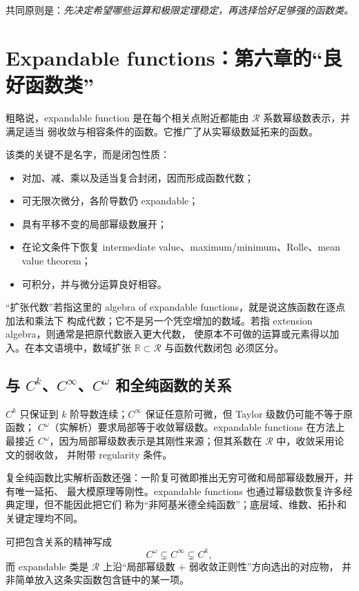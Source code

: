 \documentclass[11pt,a4paper]{article}
\theoremstyle{remark}
\newcommand{\LC}{\mathcal R}
\newcommand{\R}{\mathbb R}
\begin{document}
共同原则是：\emph{先决定希望哪些运算和极限定理稳定，再选择恰好足够强的函数类。}

\section{Expandable functions：第六章的“良好函数类”}

粗略说，expandable function 是在每个相关点附近都能由 $\LC$ 系数幂级数表示，并满足适当
弱收敛与相容条件的函数。它推广了从实幂级数延拓来的函数。

该类的关键不是名字，而是闭包性质：

\begin{itemize}
\item 对加、减、乘以及适当复合封闭，因而形成函数代数；
\item 可无限次微分，各阶导数仍 expandable；
\item 具有平移不变的局部幂级数展开；
\item 在论文条件下恢复 intermediate value、maximum/minimum、Rolle、mean value theorem；
\item 可积分，并与微分运算良好相容。
\end{itemize}

“扩张代数”若指这里的 algebra of expandable functions，就是说这族函数在逐点加法和乘法下
构成代数；它不是另一个凭空增加的数域。若指 extension algebra，则通常是把原代数嵌入更大代数，
使原本不可做的运算或元素得以加入。在本文语境中，数域扩张 $\R\subset\LC$ 与函数代数闭包
必须区分。

\subsection{与 $C^k$、$C^\infty$、$C^\omega$ 和全纯函数的关系}

$C^k$ 只保证到 $k$ 阶导数连续；$C^\infty$ 保证任意阶可微，但 Taylor 级数仍可能不等于原函数；
$C^\omega$（实解析）要求局部等于收敛幂级数。expandable functions 在方法上最接近
$C^\omega$，因为局部幂级数表示是其刚性来源；但其系数在 $\LC$ 中，收敛采用论文的弱收敛，
并附带 regularity 条件。

复全纯函数比实解析函数还强：一阶复可微即推出无穷可微和局部幂级数展开，并有唯一延拓、
最大模原理等刚性。expandable functions 也通过幂级数恢复许多经典定理，但不能因此把它们
称为“非阿基米德全纯函数”；底层域、维数、拓扑和关键定理均不同。

可把包含关系的精神写成
\[
C^\omega\subsetneq C^\infty\subsetneq C^k,
\]
而 expandable 类是 $\LC$ 上沿“局部幂级数 $+$ 弱收敛正则性”方向选出的对应物，
并非简单放入这条实函数包含链中的某一项。
\end{document}
